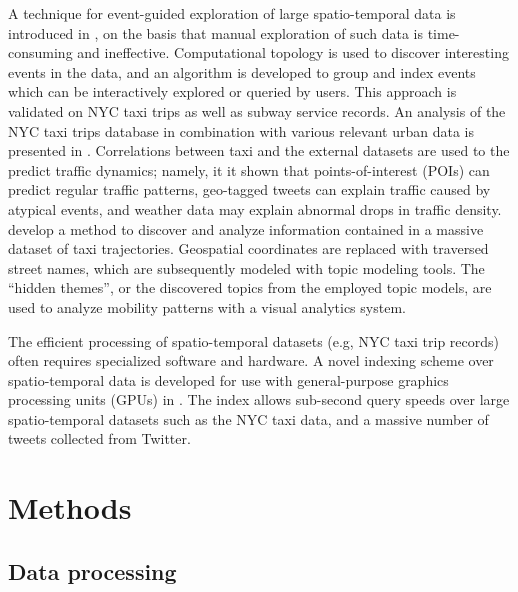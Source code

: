 \documentclass[useAMS, referee, usenatbib]{biom}
\begin{document}
A technique for event-guided exploration of large spatio-temporal data is introduced in \citet{Doraiswamy2014UsingTA}, on the basis that manual exploration of such data is time-consuming and ineffective. Computational topology is used to discover interesting events in the data, and an algorithm is developed to group and index events which can be interactively explored or queried by users. This approach is validated on NYC taxi trips as well as subway service records. An analysis of the NYC taxi trips database in combination with various relevant urban data is presented in \citet{Wu2016InterpretingTD}. Correlations between taxi and the external datasets are used to the predict traffic dynamics; namely, it it shown that points-of-interest (POIs) can predict regular traffic patterns, geo-tagged tweets can explain traffic caused by atypical events, and weather data may explain abnormal drops in traffic density. \citet{Chu2014VisualizingHT} develop a method to discover and analyze information contained in a massive dataset of taxi trajectories. Geospatial coordinates are replaced with traversed street names, which are subsequently modeled with topic modeling tools. The ``hidden themes'', or the discovered topics from the employed topic models, are used to analyze mobility patterns with a visual analytics system. 

The efficient processing of spatio-temporal datasets (e.g, NYC taxi trip records) often requires specialized software and hardware. A novel indexing scheme over spatio-temporal data is developed for use with general-purpose graphics processing units (GPUs) in \citet{Doraiswamy2016AGI}. The index allows sub-second query speeds over large spatio-temporal datasets such as the NYC taxi data, and a massive number of tweets collected from Twitter.

\section{Methods}
\label{s:methods}

\subsection{Data processing}
\end{document}
